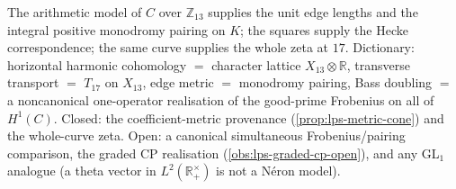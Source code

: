 \begin{observation}
\label{obs:cerednik-drinfeld-next}
The arithmetic model of $C$ over $\mathbb Z_{13}$ supplies the unit edge lengths and the integral positive monodromy pairing on $K$; the
squares supply the Hecke correspondence; the same curve supplies the whole zeta at $17$. Dictionary: horizontal harmonic
cohomology $=$ character lattice $X_{13}\otimes\mathbb R$, transverse transport $=$ $T_{17}$ on $X_{13}$, edge metric $=$ monodromy pairing, Bass
doubling $=$ a noncanonical one-operator realisation of the good-prime Frobenius on all of $H^1(C)$. Closed: the coefficient-metric
provenance (\cref{prop:lps-metric-cone}) and the whole-curve zeta. Open: a canonical simultaneous Frobenius/pairing comparison,
the graded CP realisation (\cref{obs:lps-graded-cp-open}), and any GL$_1$ analogue (a theta vector in $L^2(\mathbb R_+^\times)$ is not a
N\'eron model).
\end{observation}
